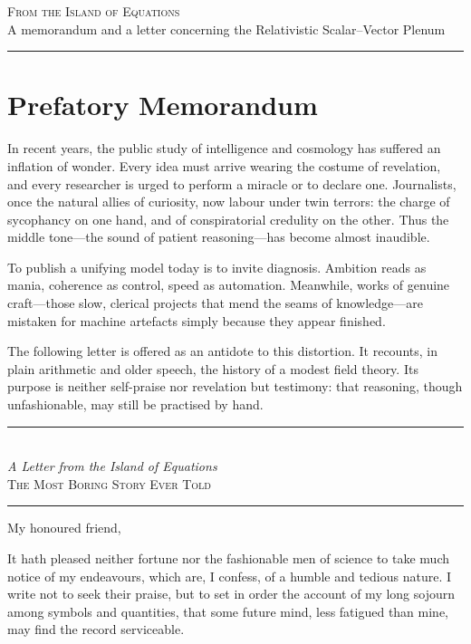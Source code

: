 \documentclass[12pt]{article}
\begin{document}
\begin{center}
{\Large\textsc{From the Island of Equations}}\\[1ex]
{\small A memorandum and a letter concerning the Relativistic Scalar--Vector Plenum}\\[2ex]
{\rule{0.4\textwidth}{0.4pt}}
\end{center}

\section*{Prefatory Memorandum}

In recent years, the public study of intelligence and cosmology has suffered an inflation of wonder. 
Every idea must arrive wearing the costume of revelation, and every researcher is urged to perform a miracle or to declare one. 
Journalists, once the natural allies of curiosity, now labour under twin terrors: the charge of sycophancy on one hand, and of conspiratorial credulity on the other. 
Thus the middle tone---the sound of patient reasoning---has become almost inaudible.

To publish a unifying model today is to invite diagnosis. 
Ambition reads as mania, coherence as control, speed as automation. 
Meanwhile, works of genuine craft---those slow, clerical projects that mend the seams of knowledge---are mistaken for machine artefacts simply because they appear finished.

The following letter is offered as an antidote to this distortion. 
It recounts, in plain arithmetic and older speech, the history of a modest field theory. 
Its purpose is neither self-praise nor revelation but testimony: that reasoning, though unfashionable, may still be practised by hand.

\bigskip
\begin{center}
{\rule{0.3\textwidth}{0.4pt}}\\
\textit{A Letter from the Island of Equations}\\
\textsc{The Most Boring Story Ever Told}\\
{\rule{0.3\textwidth}{0.4pt}}
\end{center}

\RaggedRight
My honoured friend,

It hath pleased neither fortune nor the fashionable men of science to take much notice of my endeavours, which are, I confess, of a humble and tedious nature. 
I write not to seek their praise, but to set in order the account of my long sojourn among symbols and quantities, that some future mind, less fatigued than mine, may find the record serviceable.
\end{document}
